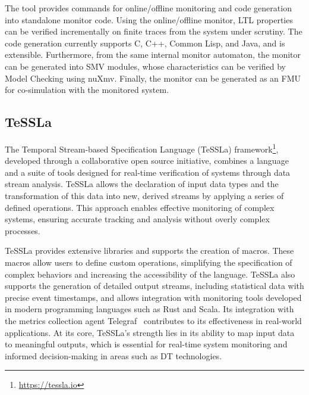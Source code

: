 The tool provides commands for online/offline monitoring and code
generation into standalone monitor code. Using the online/offline
monitor, LTL properties can be verified incrementally on finite traces
from the system under scrutiny. The code generation currently supports
C, C++, Common Lisp, and Java, and is extensible. Furthermore, from the
same internal monitor automaton, the monitor can be generated into SMV
modules, whose characteristics can be verified by Model Checking using
nuXmv. Finally, the monitor can be generated as an FMU for
co-simulation with the monitored system.

\subsection{TeSSLa}
The Temporal Stream-based Specification Language (TeSSLa) framework\footnote{\url{https://tessla.io}}, developed through a collaborative open source initiative, combines a language and a suite of tools designed for real-time verification of systems through data stream analysis. TeSSLa allows the declaration of input data types and the transformation of this data into new, derived streams by applying a series of defined operations. This approach enables effective monitoring of complex systems, ensuring accurate tracking and analysis without overly complex processes.

TeSSLa provides extensive libraries and supports the creation of macros. These macros allow users to define custom operations, simplifying the specification of complex behaviors and increasing the accessibility of the language. TeSSLa also supports the generation of detailed output streams, including statistical data with precise event timestamps, and allows integration with monitoring tools developed in modern programming languages such as Rust and Scala. Its integration with the metrics collection agent Telegraf~\cite{TT-Connector} contributes to its effectiveness in real-world applications.
At its core, TeSSLa's strength lies in its ability to map input data to meaningful outputs, which is essential for real-time system monitoring and informed decision-making in areas such as DT technologies.

